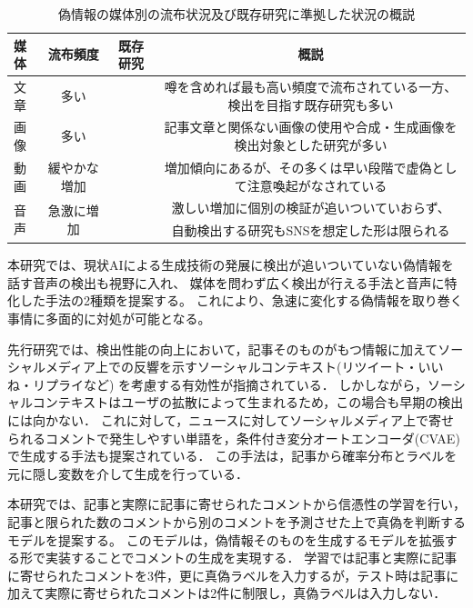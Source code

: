 \begin{landscape}
\begin{table}[p]
    \centering
    \begin{tabular}{l|c|c|c} \hline
       媒体 & 流布頻度 & 既存研究 & 概説\\ \hline\hline
       文章 & 多い & \cite{yanagi2021classifying,10.1145/3292500.3330935} & 噂を含めれば最も高い頻度で流布されている一方、検出を目指す既存研究も多い \\
       画像 & 多い & \cite{Wang:2018:EEA:3219819.3219903,8919302} & 記事文章と関係ない画像の使用や合成・生成画像を検出対象とした研究が多い \\
       動画 & 緩やかな増加 & \cite{8683164,8668407} & 増加傾向にあるが、その多くは早い段階で虚偽として注意喚起がなされている \\
       \multirow{2}{*}{音声} & \multirow{2}{*}{急激に増加\cite{cox_2023}} & \multirow{2}{*}{\cite{yamagishi21_asvspoof}} & %
       激しい増加に個別の検証が追いついていおらず、\\
       & & & 自動検出する研究もSNSを想定した形は限られる \\ \hline
    \end{tabular}
    \caption{偽情報の媒体別の流布状況及び既存研究に準拠した状況の概説}
    \label{tab:modality}
\end{table}
\end{landscape}

本研究では、現状AIによる生成技術の発展に検出が追いついていない偽情報を話す音声の検出も視野に入れ、
媒体を問わず広く検出が行える手法と音声に特化した手法の2種類を提案する。
これにより、急速に変化する偽情報を取り巻く事情に多面的に対処が可能となる。

先行研究では、検出性能の向上において，記事そのものがもつ情報に加えてソーシャルメディア上での反響を示すソーシャルコンテキスト(リツイート・いいね・リプライなど)
を考慮する有効性が指摘されている\cite{Guo:2018:RDH:3269206.3271709}．
しかしながら，ソーシャルコンテキストはユーザの拡散によって生まれるため，この場合も早期の検出には向かない．
これに対して，ニュースに対してソーシャルメディア上で寄せられるコメントで発生しやすい単語を，条件付き変分オートエンコーダ(CVAE)で生成する手法も提案されている\cite{ijcai2018-533}．
この手法は，記事から確率分布とラベルを元に隠し変数を介して生成を行っている．

本研究では、記事と実際に記事に寄せられたコメントから信憑性の学習を行い，記事と限られた数のコメントから別のコメントを予測させた上で真偽を判断するモデルを提案する。
このモデルは，偽情報そのものを生成するモデル\cite{DBLP:journals/corr/abs-1905-12616}を拡張する形で実装することでコメントの生成を実現する．
学習では記事と実際に記事に寄せられたコメントを3件，更に真偽ラベルを入力するが，テスト時は記事に加えて実際に寄せられたコメントは2件に制限し，真偽ラベルは入力しない．

